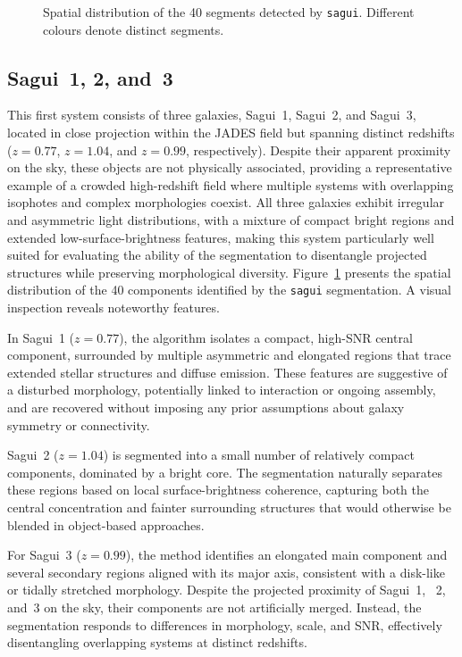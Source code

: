 \documentclass[fleqn,usenatbib]{mnras}
\begin{document}
\begin{figure}
\centering
\caption{Spatial distribution of the 40 segments detected by \texttt{sagui}. Different colours denote distinct segments.}
\label{fig:mosaic_segmentations}
\end{figure}



\subsection{Sagui~1, 2, and~3}

This first system consists of three galaxies, Sagui~1, Sagui~2, and
Sagui~3, located in close projection within the JADES field but spanning distinct redshifts ($z=0.77$, $z=1.04$, and $z=0.99$, respectively). Despite their apparent proximity on the sky, these objects are not physically associated, providing a representative example of a crowded high-redshift field where multiple systems with overlapping isophotes and complex morphologies coexist. All three galaxies exhibit irregular and asymmetric light distributions, with a mixture of compact bright regions and extended low-surface-brightness features, making this system particularly well suited for evaluating the ability of the segmentation to disentangle projected structures while preserving morphological diversity.
Figure~\ref{fig:mosaic_segmentations} presents the spatial distribution of the 40 components identified by the \texttt{sagui} segmentation. %
A visual inspection reveals noteworthy features.

In Sagui~1 ($z=0.77$), the algorithm isolates a compact, high-SNR central component, surrounded by multiple asymmetric and elongated regions that trace extended stellar structures and diffuse emission. These features are suggestive of a disturbed morphology, potentially linked to interaction or  ongoing assembly, and are recovered without imposing any prior assumptions about galaxy symmetry or connectivity.

Sagui~2 ($z=1.04$) is segmented into a small number of relatively compact components, dominated by a bright core. The segmentation naturally separates these regions based on local surface-brightness coherence, capturing both the central concentration and fainter surrounding structures that would otherwise be blended in object-based approaches.

For Sagui~3 ($z=0.99$), the method identifies an elongated main component
and several secondary regions aligned with its major axis, consistent with a disk-like or tidally stretched morphology. Despite the projected
proximity of Sagui~1, ~2, and~3 on the sky, their components are not
artificially merged. Instead, the segmentation responds to differences in morphology, scale, and SNR, effectively disentangling overlapping systems at distinct redshifts.
\end{document}
